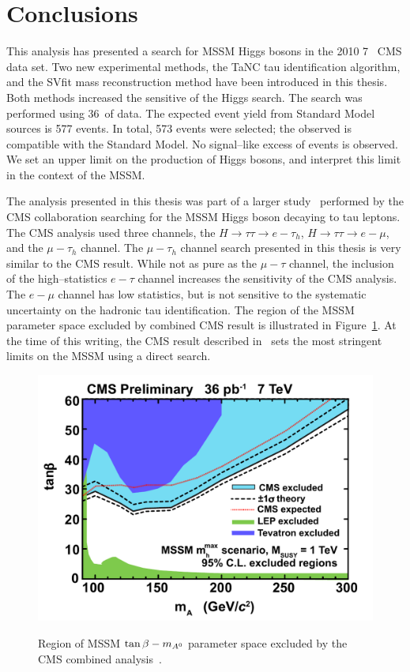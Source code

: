 \ifx\master\undefined\fi
%
\chapter*{Conclusions}
\label{ch:conclusions}

This analysis has presented a search for MSSM Higgs bosons in the 2010 7~\TeV
CMS data set. Two new experimental methods, the TaNC tau identification
algorithm, and the SVfit mass reconstruction method have been introduced in this
thesis.  Both methods increased the sensitive of the Higgs search.  The search
was performed using 36~\pbinv of data.  The expected event yield from Standard
Model sources is 577 events. In total, 573 events were selected; the observed is
compatible with the Standard Model.  No signal--like excess of events is
observed.  We set an upper limit on the production of Higgs bosons, and
interpret this limit in the context of the MSSM.

The analysis presented in this thesis was part of a larger
study~\cite{HIG-10-002} performed by the CMS collaboration searching for the
MSSM Higgs boson decaying to tau leptons.  The CMS analysis used three channels,
the $H \to \tau \tau \to e-\tau_h$, $H \to \tau \tau \to e-\mu$, and the
$\mu-\tau_h$ channel.  The $\mu-\tau_h$ channel search presented in this thesis
is very similar to the CMS result.  While not as pure as the $\mu-\tau$ channel,
the inclusion of the high--statistics $e-\tau$ channel increases the sensitivity
of the CMS analysis.  The $e-\mu$ channel has low statistics, but is not
sensitive to the systematic uncertainty on the hadronic tau identification.  The
region of the MSSM parameter space excluded by combined CMS result is
illustrated in Figure~\ref{fig:CMSTanBetaExclusion}.  At the time of this
writing, the CMS result described in~\cite{HIG-10-002} sets the most stringent
limits on the MSSM using a direct search.  
%
\begin{figure}[htb]
  \centering
  \includegraphics[width=\textwidth]{conclusions_chapter/figures/tanbeta-ma-LEP-Tev.pdf}
  \label{fig:CMSTanBetaExclusion} 
  \caption[CMS combined exclusion of MSSM $\tb-\ma$ parameter space]{Region of MSSM
  $\tb-\ma$ parameter space excluded by the CMS combined
  analysis~\cite{HIG-10-002}.}
\end{figure}

\ifx\master\undefined\fi
